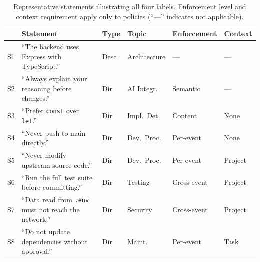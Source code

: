 \begin{table}[t]
\caption{Representative statements illustrating all four labels. Enforcement level and context requirement apply only to policies (``---'' indicates not applicable).}
\label{tab:examples}
\centering
\small
\begin{tabular}{@{}clllll@{}}
\toprule
& \textbf{Statement} & \textbf{Type} & \textbf{Topic} & \textbf{Enforcement} & \textbf{Context} \\
\midrule
S1 & ``The backend uses Express with TypeScript.'' & Desc & Architecture & --- & --- \\
S2 & ``Always explain your reasoning before changes.'' & Dir & AI Integr. & Semantic & --- \\
S3 & ``Prefer \texttt{const} over \texttt{let}.'' & Dir & Impl.\ Det. & Content & None \\
S4 & ``Never push to main directly.'' & Dir & Dev.\ Proc. & Per-event & None \\
S5 & ``Never modify upstream source code.'' & Dir & Dev.\ Proc. & Per-event & Project \\
S6 & ``Run the full test suite before committing.'' & Dir & Testing & Cross-event & Project \\
S7 & ``Data read from \texttt{.env} must not reach the network.'' & Dir & Security & Cross-event & Project \\
S8 & ``Do not update dependencies without approval.'' & Dir & Maint. & Per-event & Task \\
\bottomrule
\end{tabular}
\end{table}

